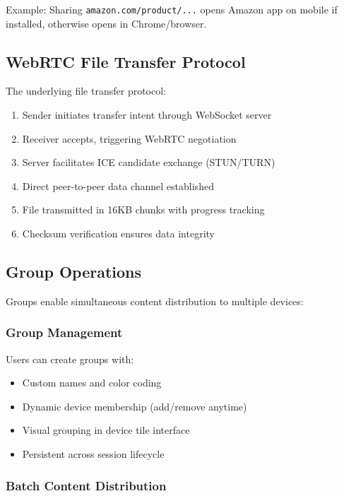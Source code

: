\documentclass[conference]{IEEEtran}
\begin{document}
Example: Sharing \texttt{amazon.com/product/...} opens Amazon app on mobile if installed, otherwise opens in Chrome/browser.

\subsection{WebRTC File Transfer Protocol}

The underlying file transfer protocol:

\begin{enumerate}
    \item Sender initiates transfer intent through WebSocket server
    \item Receiver accepts, triggering WebRTC negotiation
    \item Server facilitates ICE candidate exchange (STUN/TURN)
    \item Direct peer-to-peer data channel established
    \item File transmitted in 16KB chunks with progress tracking
    \item Checksum verification ensures data integrity
\end{enumerate}

\subsection{Group Operations}

Groups enable simultaneous content distribution to multiple devices:

\subsubsection{Group Management}

Users can create groups with:
\begin{itemize}
    \item Custom names and color coding
    \item Dynamic device membership (add/remove anytime)
    \item Visual grouping in device tile interface
    \item Persistent across session lifecycle
\end{itemize}

\subsubsection{Batch Content Distribution}
\end{document}
